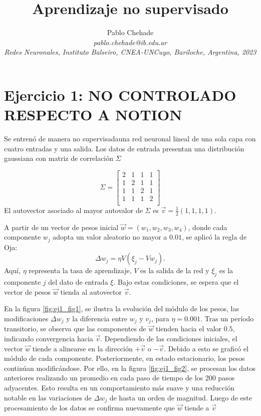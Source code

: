 \documentclass[aps,prb,twocolumn,superscriptaddress,floatfix,longbibliography]{revtex4-2}
\newcounter{para}
\begin{document}
\newcommand{\mytitle}{Aprendizaje no supervisado}

\title{\mytitle}

\author{Pablo Chehade \\
    \small \textit{pablo.chehade@ib.edu.ar} \\
    \small \textit{Redes Neuronales, Instituto Balseiro, CNEA-UNCuyo, Bariloche, Argentina, 2023} \\}
    
\maketitle




\section*{Ejercicio 1: NO CONTROLADO RESPECTO A NOTION}


Se entrenó de manera no supervisadauna red neuronal lineal de una sola capa con cuatro entradas y una salida. Los datos de entrada presentan una distribución gaussiana con matriz de correlación $\Sigma$



\[
\Sigma = \begin{bmatrix}
2 & 1 & 1 & 1 \\
1 & 2 & 1 & 1 \\
1 & 1 & 2 & 1 \\
1 & 1 & 1 & 2 \\
\end{bmatrix}
\]
El autovector asociado al mayor autovalor de $\Sigma$ es $\vec{v} = \frac{1}{2}(1, 1, 1, 1)$. 


A partir de un vector de pesos inicial $\vec{w} = (w_1, w_2, w_3, w_4)$, donde cada componente $w_j$ adopta un valor aleatorio no mayor a $0.01$, se aplicó la regla de Oja:
\[
\Delta w_j = \eta V ( \xi_j - V w_j ).
\]
Aquí, $\eta$ representa la tasa de aprendizaje, $V$ es la salida de la red y $\xi_j$ es la componente $j$ del dato de entrada $\xi$. Bajo estas condiciones, se espera que el vector de pesos $\vec{w}$ tienda al autovector $\vec{v}$.


En la figura \ref{fig:ej1_fig1}, se ilustra la evolución del módulo de los pesos, las modificaciones $\Delta w_j$ y la diferencia entre $w_j$ y $v_j$, para $\eta = 0.001$. Tras un período transitorio, se observa que las componentes de $\vec{w}$ tienden hacia el valor $0.5$, indicando convergencia hacia $\vec{v}$. Dependiendo de las condiciones iniciales, el vector $\vec{w}$ tiende a alinearse en la dirección $+\vec{v}$ o $-\vec{v}$. Debido a esto se graficó el módulo de cada componente. Posteriormente, en estado estacionario, los pesos continúan modificándose. Por ello, en la figura \ref{fig:ej1_fig2}, se procesan los datos anteriores realizando un promedio en cada paso de tiempo de los 200 pasos adyacentes. Esto resulta en un comportamiento más suave y una reducción notable en las variaciones de $\Delta w_j$ de hasta un orden de magnitud. Luego de este procesamiento de los datos se confirma nuevamente que $\vec{w}$ tiende a $\vec{v}$
\end{document}
